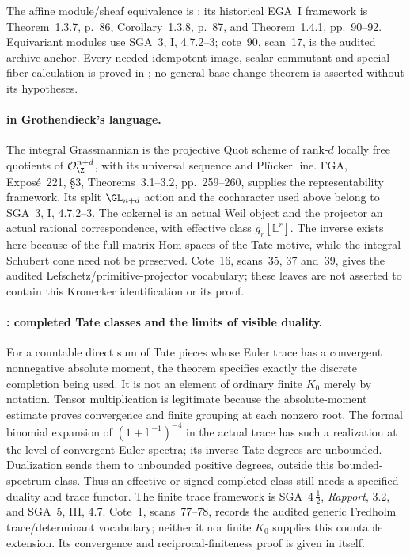 The affine module/sheaf equivalence is
\cite[Lemma~26.7.5, tag~01IB]{StacksAffine}; its historical
EGA~I framework is Theorem~1.3.7, p.~86, Corollary~1.3.8,
p.~87, and Theorem~1.4.1, pp.~90--92. Equivariant modules use
SGA~3, I, 4.7.2--3; cote~90,
scan~17, is the audited archive anchor. Every needed idempotent
image, scalar commutant and special-fiber calculation is proved
in ; no general base-change theorem is asserted without
its hypotheses.

\paragraph{ in Grothendieck's language.}
The integral Grassmannian is the projective Quot scheme of
rank-$d$ locally free quotients of $\mathcal O_{\Z}^{n+d}$,
with its universal sequence and Pl\"ucker line. FGA, Expos\'e~221,
\S3, Theorems~3.1--3.2, pp.~259--260, supplies the representability
framework. Its split $\GL_{n+d}$ action and the cocharacter used
above belong to SGA~3, I, 4.7.2--3. The cokernel is an actual
Weil object and the projector an actual rational correspondence,
with effective class $g_r[\mathbb L^r]$. The inverse exists here
because of the full matrix Hom spaces of the Tate motive, while
the integral Schubert cone need not be preserved. Cote~16,
scans~35, 37 and~39, gives the audited Lefschetz/primitive-projector
vocabulary; these leaves are not asserted to contain this
Kronecker identification or its proof.


\paragraph{: completed Tate classes and the limits of visible duality.}
For a countable direct sum of Tate pieces whose Euler trace has a
convergent nonnegative absolute moment, the theorem specifies exactly
the discrete completion being used. It is not an element of ordinary
finite $K_0$ merely by notation. Tensor multiplication is legitimate
because the absolute-moment estimate proves convergence and finite
grouping at each nonzero root. The formal binomial expansion of
$(1+\mathbb L^{-1})^{-4}$ in the actual trace has such a realization
at the level of convergent Euler spectra; its inverse Tate degrees
are unbounded. Dualization sends them to unbounded positive degrees,
outside this bounded-spectrum class. Thus an effective or signed
completed class still needs a specified duality and trace functor.
The finite trace framework is SGA~4\,$\frac12$, \emph{Rapport},
3.2, and SGA~5, III, 4.7. Cote~1, scans~77--78, records the
audited generic Fredholm trace/determinant vocabulary; neither it
nor finite $K_0$ supplies this countable extension. Its convergence
and reciprocal-finiteness proof is given in  itself.

